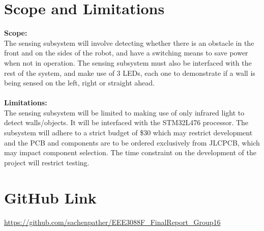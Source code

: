 \documentclass[class=report,11pt,crop=false]{standalone}
\begin{document}
\section{Scope and Limitations}
\textbf{Scope:} \\
 The sensing subsystem will involve detecting whether there is an obstacle in the front and on the sides of the robot, and have a switching means to save power when not in operation. The sensing subsystem must also be interfaced with the rest of the system, and make use of 3 LEDs, each one to demonstrate if a wall is being sensed on the left, right or straight ahead.  \\ \\
\textbf{Limitations:} \\
The sensing subsystem will be limited to making use of only infrared light to detect walls/objects. It will be interfaced with the STM32L476 processor. The subsystem will adhere to a strict budget of \$30 which may restrict development and the PCB and components are to be ordered exclusively from JLCPCB, which may impact component selection. The time constraint on the development of the project will restrict testing.

\section{GitHub Link}
\url{https://github.com/sachenpather/EEE3088F_FinalReport_Group16}
\ifstandalone

\fi
\end{document}
